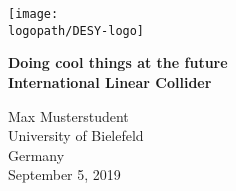 \begin{titlepage}

  \begin{center}
    \texttt{[image: \\logopath/DESY-logo]}
  \end{center}

  \vspace{0em}

  \begin{minipage}[t]{\textwidth}

    \begin{minipage}{\linewidth}

      \vspace{0em}

      \begin{center}\bfseries\huge
        Doing cool things at the future\\ International Linear Collider
      \end{center}

      \vspace{1.0 em}

      \begin{center}\large
        Max Musterstudent\\
        University of Bielefeld\\
        Germany\\[0.5cm]
        September 5, 2019
      \end{center}

    \end{minipage}
  \end{minipage}
  
  \vspace{1cm}

  \begin{abstract}
    
  \end{abstract}

\end{titlepage}
